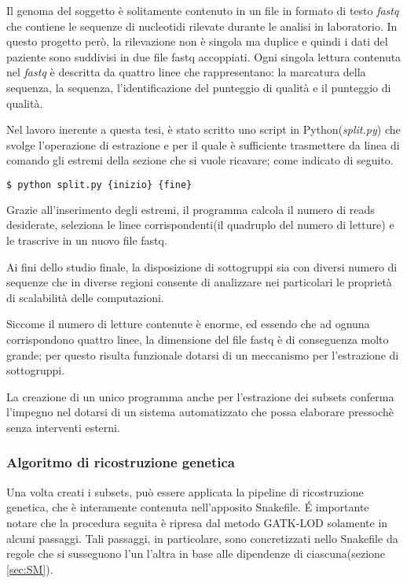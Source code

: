 Il genoma del soggetto è solitamente contenuto in un file in formato di testo \textit{fastq} che contiene le sequenze di nucleotidi rilevate durante le analisi in laboratorio.
In questo progetto però, la rilevazione non è singola ma duplice e quindi i dati del paziente sono suddivisi in due file fastq accoppiati.
Ogni singola lettura contenuta nel \textit{fastq} è descritta da quattro linee che rappresentano: la marcatura della sequenza, la sequenza, l'identificazione del punteggio di qualità e il punteggio di qualità.


Nel lavoro inerente a questa tesi, è stato scritto uno script in Python(\textit{split.py}) che svolge l'operazione di estrazione e per il quale è sufficiente trasmettere da linea di comando gli estremi della sezione che si vuole ricavare; come indicato di seguito.
\begin{lstlisting}[language=Python]
$ python split.py {inizio} {fine}
\end{lstlisting}
Grazie all'inserimento degli estremi, il programma calcola il numero di reads desiderate, seleziona le linee corrispondenti(il quadruplo del numero di letture) e le trascrive in un nuovo file fastq.

Ai fini dello studio finale, la disposizione di sottogruppi sia con diversi numero di sequenze che in diverse regioni consente di analizzare nei particolari le proprietà di scalabilità delle computazioni.

Siccome il numero di letture contenute è enorme, ed essendo che ad ognuna corrispondono quattro linee, la dimensione del file fastq è di conseguenza molto grande; per questo risulta funzionale dotarsi di un meccanismo per l'estrazione di sottogruppi.

La creazione di un unico programma anche per l'estrazione dei subsets conferma l'impegno nel dotarsi di un sistema automatizzato che possa elaborare pressochè senza interventi esterni.


\subsubsection{Algoritmo di ricostruzione genetica}
Una volta creati i subsets, può essere applicata la pipeline di ricostruzione genetica, che è interamente contenuta nell'apposito Snakefile.
\'E importante notare che la procedura seguita è ripresa dal metodo GATK-LOD solamente in alcuni passaggi.
Tali passaggi, in particolare, sono concretizzati nello Snakefile da regole che si susseguono l'un l'altra in base alle dipendenze di ciascuna(sezione \ref{sec:SM}).

